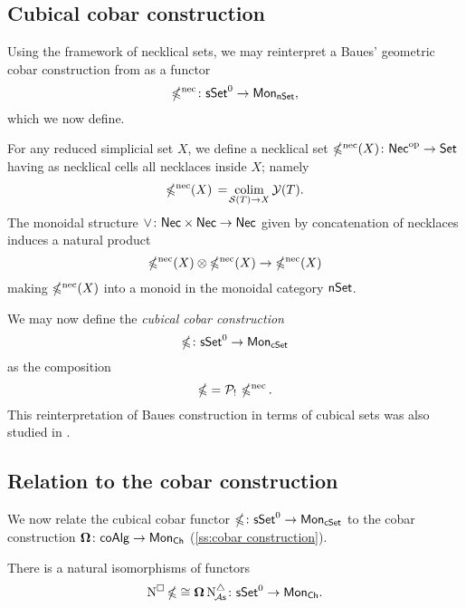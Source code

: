 \subsection{Cubical cobar construction} \label{ss:cubical cobar}

Using the framework of necklical sets, we may reinterpret a Baues' geometric cobar construction from \cite{baues1998hopf} as a functor
\[
\operatorname{\mathbb{\Omega}^{\mathrm{nec}}} \colon \mathsf{sSet}^0 \to \mathsf{Mon}_{\mathsf{nSet}},
\]
which we now define.

For any reduced simplicial set $X$, we define a necklical set $\operatorname{\mathbb{\Omega}^{\mathrm{nec}}}(X) \colon \mathsf{Nec}^{\mathrm{op}} \to \mathsf{Set}$ having as necklical cells all necklaces inside $X$; namely
\[
\operatorname{\mathbb{\Omega}^{\mathrm{nec}}}(X) \, = \! \operatorname*{colim}_{\mathcal{S}(T) \to X} \mathcal{Y}(T).
\]
The monoidal structure $\vee \colon \mathsf{Nec} \times \mathsf{Nec} \to \mathsf{Nec}$ given by concatenation of necklaces induces a natural product
\[
\operatorname{\mathbb{\Omega}^{\mathrm{nec}}}(X) \otimes \operatorname{\mathbb{\Omega}^{\mathrm{nec}}}(X) \to \operatorname{\mathbb{\Omega}^{\mathrm{nec}}}(X)
\]
making $\operatorname{\mathbb{\Omega}^{\mathrm{nec}}}(X)$ into a monoid in the monoidal category $\mathsf{nSet}$.

We may now define the \textit{cubical cobar construction}
\[
\operatorname{\mathbb{\Omega}} \colon \mathsf{sSet}^0 \to \mathsf{Mon}_{\mathsf{cSet}}
\]
as the composition
\[
\operatorname{\mathbb{\Omega}} = \mathcal{P}_! \, \operatorname{\mathbb{\Omega}^{\mathrm{nec}}}.
\]
This reinterpretation of Baues construction in terms of cubical sets was also studied in \cite{rivera2018cubical}.

\subsection{Relation to the cobar construction}

We now relate the cubical cobar functor $\operatorname{\mathbb{\Omega}} \colon \mathsf{sSet}^0 \to \mathsf{Mon}_{\mathsf{cSet}}$ to the cobar construction $\operatorname{\mathbf{\Omega}} \colon \mathsf{coAlg} \to \mathsf{Mon}_{\mathsf{Ch}}$ (\cref{ss:cobar construction}).

\begin{lemma} \label{l:ccobar and cobar}
	There is a natural isomorphisms of functors
	\[
	\operatorname{N^{\square}} \operatorname{\mathbb{\Omega}} \cong \operatorname{\mathbf{\Omega}} \operatorname{N^{\triangle}_{\!{\mathcal{A}\mathsf{s}}}} \colon \mathsf{sSet}^0 \to \mathsf{Mon}_{\mathsf{Ch}}.
	\]
\end{lemma}

